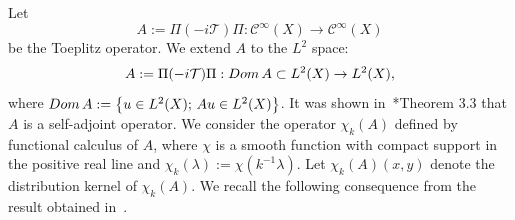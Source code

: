 \documentclass[12pt]{amsart}
\theoremstyle{definition}
\theoremstyle{named}
\numberwithin{equation}{subsection}
\newcommand{\set}[1]{\left\{#1\right\}}
\newcommand{\To}{\rightarrow}
\def\cC{\mathscr{C}}
\begin{document}
Let 
 \[A:=\Pi(-i\mathcal{T})\Pi: \cC^\infty(X)\To\cC^\infty(X)\]
 be the Toeplitz operator. We extend $A$ to the $L^2$ space:
 \begin{eqnarray}\label{eq:DefExtensionToeplitzOperator}
 	A:=\Pi(-i\mathcal{T})\Pi: {\rm Dom\,}A\subset L^2(X)\To L^2(X),
 \end{eqnarray}
  where ${\rm Dom\,}A:=\set{u\in L^2(X);\, Au\in L^2(X)}$. It was shown in~\cite{HHMS23}*{Theorem 3.3} that $A$ is a self-adjoint operator. We  consider the operator $\chi_k(A)$ 
defined by functional
calculus of $A$, where $\chi$ is a smooth function
with compact support in the positive real line and 
$\chi_k(\lambda):=\chi(k^{-1}\lambda)$.  Let $\chi_k(A)(x,y)$ denote the distribution kernel of $\chi_k(A)$. We recall the following consequence from the result obtained in~\cite{HHMS23}. 
 
\end{document}
